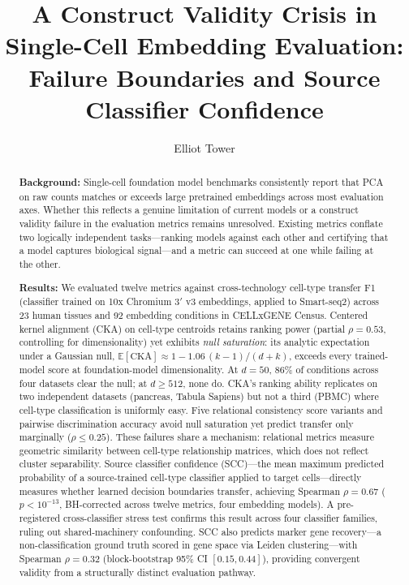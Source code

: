 \documentclass[11pt]{article}
\title{A Construct Validity Crisis in Single-Cell Embedding Evaluation:\\
Failure Boundaries and Source Classifier Confidence}
\author{Elliot Tower}
\affil{Independent Researcher \\ \texttt{elliot@elliottower.ai}}
\date{}
\begin{document}
\linenumbers
\maketitle

\begin{abstract}

\textbf{Background:}
Single-cell foundation model benchmarks consistently report that PCA
on raw counts matches or exceeds large pretrained embeddings across
most evaluation axes. Whether this reflects a genuine limitation of
current models or a construct validity failure in the evaluation
metrics remains unresolved. Existing metrics conflate two logically
independent tasks---ranking models against each other and certifying
that a model captures biological signal---and a metric can succeed at
one while failing at the other.

\textbf{Results:}
We evaluated twelve metrics against cross-technology cell-type
transfer F1 (classifier trained on 10x Chromium 3$'$ v3 embeddings,
applied to Smart-seq2) across 23 human tissues and 92 embedding
conditions in CELLxGENE Census. Centered kernel alignment (CKA) on
cell-type centroids retains ranking power (partial $\rho = 0.53$,
controlling for dimensionality) yet exhibits \emph{null saturation}:
its analytic expectation under a Gaussian null,
$\mathbb{E}[\mathrm{CKA}] \approx 1 - 1.06\,(k{-}1)/(d{+}k)$,
exceeds every trained-model score at foundation-model dimensionality.
At $d = 50$, 86\% of conditions across four datasets clear the null;
at $d \geq 512$, none do. CKA's ranking ability replicates on two
independent datasets (pancreas, Tabula Sapiens) but not a third
(PBMC) where cell-type classification is uniformly easy. Five
relational consistency score variants and pairwise discrimination
accuracy avoid null saturation yet predict transfer only marginally
($\rho \leq 0.25$). These failures share a mechanism: relational
metrics measure geometric similarity between cell-type relationship
matrices, which does not reflect cluster separability. Source
classifier confidence (SCC)---the mean maximum predicted probability
of a source-trained cell-type classifier applied to target
cells---directly measures whether learned decision boundaries
transfer, achieving Spearman $\rho = 0.67$ ($p < 10^{-13}$,
BH-corrected across twelve metrics, four embedding models). A
pre-registered cross-classifier stress test confirms this result
across four classifier families, ruling out shared-machinery
confounding. SCC also predicts marker gene recovery---a
non-classification ground truth scored in gene space via Leiden
clustering---with Spearman $\rho = 0.32$ (block-bootstrap 95\% CI
$[0.15, 0.44]$), providing convergent validity from a structurally
distinct evaluation pathway.


\end{abstract}
\end{document}

